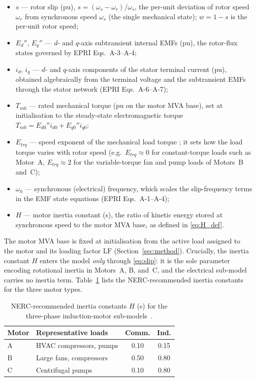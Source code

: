 \documentclass[journal]{IEEEtran}
\begin{document}
\begin{itemize}
  \item $s$ --- rotor slip (pu), $s = (\omega_s - \omega_r)/\omega_s$, the
        per-unit deviation of rotor speed $\omega_r$ from synchronous speed
        $\omega_s$ (the single mechanical state); $w = 1-s$ is the per-unit
        rotor speed;
  \item $E_d''$, $E_q''$ --- $d$- and $q$-axis subtransient internal EMFs (pu),
        the rotor-flux states governed by EPRI Eqs.~A-3--A-4;
  \item $i_d$, $i_q$ --- $d$- and $q$-axis components of the stator terminal
        current (pu), obtained algebraically from the terminal voltage and the
        subtransient EMFs through the stator network (EPRI Eqs.~A-6--A-7);
  \item $T_{m0}$ --- rated mechanical torque (pu on the motor MVA base), set at
        initialisation to the steady-state electromagnetic torque
        $T_{m0} = E_{d0}'' i_{d0} + E_{q0}'' i_{q0}$;
  \item $E_{trq}$ --- speed exponent of the mechanical load torque
        \cite{WECCspec2024}; it sets how the load torque varies with rotor
        speed (e.g.\ $E_{trq}\!\approx\!0$ for constant-torque loads such as
        Motor~A, $E_{trq}\!\approx\!2$ for the variable-torque fan and pump
        loads of Motors~B and~C);
  \item $\omega_0$ --- synchronous (electrical) frequency, which scales the
        slip-frequency terms in the EMF state equations (EPRI Eqs.~A-1--A-4);
  \item $H$ --- motor inertia constant (s), the ratio of kinetic energy stored
        at synchronous speed to the motor MVA base, as defined in \eqref{eq:H_def}.
\end{itemize}
%
The motor MVA base is fixed at initialisation from the active load assigned to
the motor and its loading factor $\mathrm{LF}$ (Section~\ref{sec:method}).
Crucially, the inertia constant $H$ enters the model \emph{only} through
\eqref{eq:slip}: it is the sole parameter encoding rotational inertia in
Motors~A, B, and~C, and the electrical sub-model carries no inertia term.
Table~\ref{tab:Hvalues} lists the NERC-recommended inertia constants for the
three motor types.

\begin{table}[t]
  \centering
  \caption{NERC-recommended inertia constants $H$ (s) for the three-phase
  induction-motor sub-models~\cite{EPRI3002019209}.}
  \label{tab:Hvalues}
  \begin{tabular}{@{}llcc@{}}
    \toprule
    Motor & Representative loads & Comm. & Ind. \\
    \midrule
    A & HVAC compressors, pumps      & 0.10 & 0.15 \\
    B & Large fans, compressors      & 0.50 & 0.80 \\
    C & Centrifugal pumps            & 0.10 & 0.80 \\
    \bottomrule
  \end{tabular}
\end{table}
\end{document}
